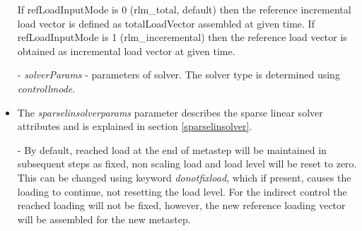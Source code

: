 \documentclass[a4paper]{article}
\newcommand{\param}[1]{{\em #1}}
\begin{document}
\begin{itemize}
If refLoadInputMode is 0 (rlm\_total, default) then the reference incremental load vector is defined as
totalLoadVector assembled at given time.
If refLoadInputMode is 1 (rlm\_inceremental) then the reference load vector is
obtained as incremental load vector at given time.
\item[-] \param{solverParams} - parameters of solver. The solver type
is determined using \param{controllmode}.
\item The  \param{sparselinsolverparams} parameter describes the sparse
linear solver attributes and is explained in section
\ref{sparselinsolver}.
\item[-] By default, reached load at the end of
metastep will be maintained in subsequent steps as fixed, non scaling
load and load level will be reset to zero. This can be changed using keyword \param{donotfixload}, which if
present, causes the loading to continue, not resetting the load
level. For the indirect control the reached loading will not be
fixed, however, the new reference loading vector will be assembled for
the new metastep. 
\end{itemize}
\end{document}
